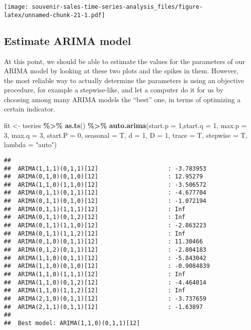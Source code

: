 \documentclass[
]{article}
\newenvironment{Shaded}{\begin{snugshade}}{\end{snugshade}}
\newcommand{\AttributeTok}[1]{\textcolor[rgb]{0.13,0.29,0.53}{#1}}
\newcommand{\DecValTok}[1]{\textcolor[rgb]{0.00,0.00,0.81}{#1}}
\newcommand{\FunctionTok}[1]{\textcolor[rgb]{0.13,0.29,0.53}{\textbf{#1}}}
\newcommand{\NormalTok}[1]{#1}
\newcommand{\OtherTok}[1]{\textcolor[rgb]{0.56,0.35,0.01}{#1}}
\newcommand{\SpecialCharTok}[1]{\textcolor[rgb]{0.81,0.36,0.00}{\textbf{#1}}}
\newcommand{\StringTok}[1]{\textcolor[rgb]{0.31,0.60,0.02}{#1}}
\begin{document}
\texttt{[image: souvenir-sales-time-series-analysis\_files/figure-latex/unnamed-chunk-21-1.pdf]}

\hypertarget{estimate-arima-model}{%
\subsection{Estimate ARIMA model}\label{estimate-arima-model}}

At this point, we should be able to estimate the values for the
parameters of our ARIMA model by looking at these two plots and the
spikes in them. However, the most reliable way to actually determine the
parameters is using an objective procedure, for example a stepwise-like,
and let a computer do it for us by choosing among many ARIMA models the
``best'' one, in terms of optimizing a certain indicator.

\begin{Shaded}
\begin{Highlighting}[]
\NormalTok{fit }\OtherTok{\textless{}{-}}\NormalTok{ tseries }\SpecialCharTok{\%\textgreater{}\%}
  \FunctionTok{as.ts}\NormalTok{() }\SpecialCharTok{\%\textgreater{}\%}
  \FunctionTok{auto.arima}\NormalTok{(}\AttributeTok{start.p =} \DecValTok{1}\NormalTok{,}\AttributeTok{start.q =} \DecValTok{1}\NormalTok{, }\AttributeTok{max.p =} \DecValTok{3}\NormalTok{, }\AttributeTok{max.q =} \DecValTok{3}\NormalTok{,}
             \AttributeTok{start.P =} \DecValTok{0}\NormalTok{, }\AttributeTok{seasonal =}\NormalTok{ T, }\AttributeTok{d =} \DecValTok{1}\NormalTok{, }\AttributeTok{D =} \DecValTok{1}\NormalTok{, }\AttributeTok{trace =}\NormalTok{ T,}
             \AttributeTok{stepwise =}\NormalTok{ T, }\AttributeTok{lambda =} \StringTok{"auto"}\NormalTok{)}
\end{Highlighting}
\end{Shaded}

\begin{verbatim}
## 
##  ARIMA(1,1,1)(0,1,1)[12]                    : -3.783953
##  ARIMA(0,1,0)(0,1,0)[12]                    : 12.95279
##  ARIMA(1,1,0)(1,1,0)[12]                    : -3.506572
##  ARIMA(0,1,1)(0,1,1)[12]                    : -4.677704
##  ARIMA(0,1,1)(0,1,0)[12]                    : -1.072194
##  ARIMA(0,1,1)(1,1,1)[12]                    : Inf
##  ARIMA(0,1,1)(0,1,2)[12]                    : Inf
##  ARIMA(0,1,1)(1,1,0)[12]                    : -2.863223
##  ARIMA(0,1,1)(1,1,2)[12]                    : Inf
##  ARIMA(0,1,0)(0,1,1)[12]                    : 11.30466
##  ARIMA(0,1,2)(0,1,1)[12]                    : -2.804183
##  ARIMA(1,1,0)(0,1,1)[12]                    : -5.843042
##  ARIMA(1,1,0)(0,1,0)[12]                    : -0.9084839
##  ARIMA(1,1,0)(1,1,1)[12]                    : Inf
##  ARIMA(1,1,0)(0,1,2)[12]                    : -4.464014
##  ARIMA(1,1,0)(1,1,2)[12]                    : Inf
##  ARIMA(2,1,0)(0,1,1)[12]                    : -3.737659
##  ARIMA(2,1,1)(0,1,1)[12]                    : -1.63897
## 
##  Best model: ARIMA(1,1,0)(0,1,1)[12]
\end{verbatim}
\end{document}
